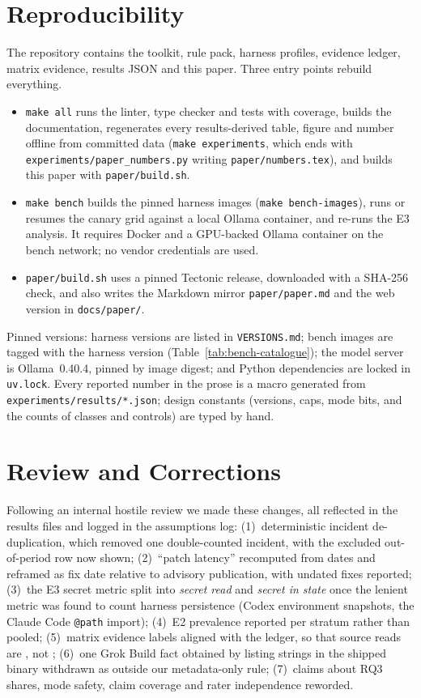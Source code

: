 \section{Reproducibility}\label{app:repro}
The repository contains the toolkit, rule pack, harness profiles, evidence ledger, matrix evidence, results JSON and this paper. Three entry points rebuild everything.
\begin{itemize}
\item \texttt{make all} runs the linter, type checker and tests with coverage, builds the documentation, regenerates every results-derived table, figure and number offline from committed data (\texttt{make experiments}, which ends with \texttt{experiments/paper\_numbers.py} writing \texttt{paper/numbers.tex}), and builds this paper with \texttt{paper/build.sh}.
\item \texttt{make bench} builds the pinned harness images (\texttt{make bench-images}), runs or resumes the canary grid against a local Ollama container, and re-runs the E3 analysis. It requires Docker and a GPU-backed Ollama container on the bench network; no vendor credentials are used.
\item \texttt{paper/build.sh} uses a pinned Tectonic release, downloaded with a SHA-256 check, and also writes the Markdown mirror \texttt{paper/paper.md} and the web version in \texttt{docs/paper/}.
\end{itemize}
Pinned versions: harness versions are listed in \texttt{VERSIONS.md}; bench images are tagged with the harness version (Table~\ref{tab:bench-catalogue}); the model server is Ollama~0.40.4, pinned by image digest; and Python dependencies are locked in \texttt{uv.lock}. Every reported number in the prose is a macro generated from \texttt{experiments/results/*.json}; design constants (versions, caps, mode bits, and the counts of classes and controls) are typed by hand.

\section{Review and Corrections}\label{app:corrections}
Following an internal hostile review we made these changes, all reflected in the results files and logged in the assumptions log: (1)~deterministic incident de-duplication, which removed one double-counted incident, with the excluded out-of-period row now shown; (2)~``patch latency'' recomputed from dates and reframed as fix date relative to advisory publication, with undated fixes reported; (3)~the E3 secret metric split into \emph{secret read} and \emph{secret in state} once the lenient metric was found to count harness persistence (Codex environment snapshots, the Claude Code \texttt{@path} import); (4)~E2 prevalence reported per stratum rather than pooled; (5)~matrix evidence labels aligned with the ledger, so that source reads are \evD{}, not \evT{}; (6)~one Grok Build fact obtained by listing strings in the shipped binary withdrawn as outside our metadata-only rule; (7)~claims about RQ3 shares, mode safety, claim coverage and rater independence reworded.


